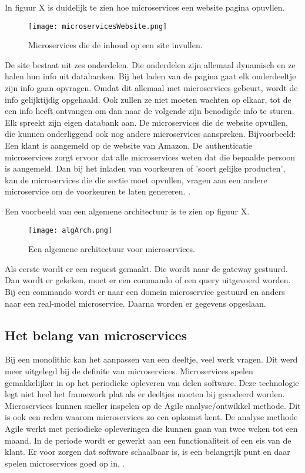 In figuur X is duidelijk te zien hoe microservices een website pagina opuvllen.
\begin{figure}[h]
	\texttt{[image: microservicesWebsite.png]}
	\centering
	\caption{Microservices die de inhoud op een site invullen. \textcite{Koukia2018}}
\end{figure}
De site bestaat uit zes onderdelen. Die onderdelen zijn allemaal dynamisch en ze halen hun info uit databanken. Bij het laden van de pagina gaat elk onderdeeltje zijn info gaan opvragen. Omdat dit allemaal met microservices gebeurt, wordt de info gelijktijdig opgehaald. Ook zullen ze niet moeten wachten op elkaar, tot de een info heeft ontvangen om dan naar de volgende zijn benodigde info te sturen. Elk spreekt zijn eigen databank aan. De microservices die de website opvullen, die kunnen onderliggend ook nog andere microservices aanspreken. Bijvoorbeeld: Een klant is aangemeld op de website van Amazon. De authenticatie microservices zorgt ervoor dat alle microservices weten dat die bepaalde persoon is aangemeld. Dan bij het inladen van voorkeuren of 'soort gelijke producten', kan de microservices die die sectie moet opvullen, vragen aan een andere microservice om de voorkeuren te laten genereren. \textcite{Koukia2018}.

Een voorbeeld van een algemene architectuur is te zien op figuur X.
\begin{figure}[h]
	\texttt{[image: algArch.png]}
	\centering
	\caption{Een algemene architectuur voor microservices. \textcite{Koukia2018}}
\end{figure}
Als eerste wordt er een request gemaakt. Die wordt naar de gateway gestuurd. Dan wordt er gekeken, moet er een commando of een query uitgevoerd worden. Bij een commando wordt er naar een domein microservice gestuurd en anders naar een real-model microservice.  Daarna worden er gegevens opgeslaan.


\subsection{Het belang van microservices}
Bij een monolithic kan het aanpassen van een deeltje, veel werk vragen. Dit werd meer uitgelegd bij de definite van microservices. Microservices spelen gemakkelijker in op het periodieke opleveren van delen software. Deze technologie legt niet heel het framework plat als er deeltjes moeten bij gecodeerd worden. Microservices kunnen sneller inspelen op de Agile analyse/ontwikkel methode. Dit is ook een reden waarom microservices zo een opkomst kent. De analyse methode Agile werkt met periodieke opleveringen die kunnen gaan van twee weken tot een maand. In de periode wordt er gewerkt aan een functionaliteit of een eis van de klant. 
Er voor zorgen dat software schaalbaar is, is een belangrijk punt en daar spelen microservices goed op in, \textcite{series2018}.



